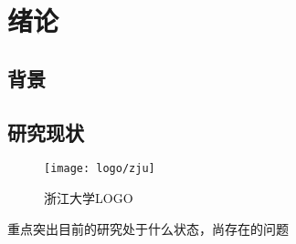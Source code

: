 

\chapter{绪论}




\section{背景}




\section{研究现状}


\begin{figure}[htbp]
    \centering
    \texttt{[image: logo/zju]}
    \caption{\label{fig:zju-logo}浙江大学LOGO}
\end{figure}

重点突出目前的研究处于什么状态，尚存在的问题

